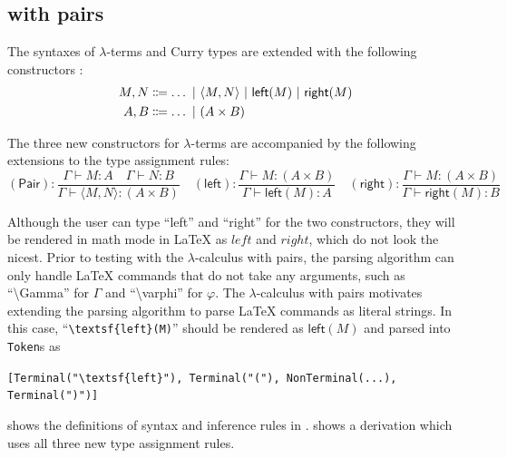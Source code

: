 \subsection{\lc{} with pairs}
\label{evaluation:lambda-pairs}
\begin{definition}
    The syntaxes of $\lambda$-terms and Curry types are extended with the following constructors \cite{van-bakel:2022}:
    \begin{align*}
        M, N &\Coloneqq \ldots \ |\  \langle M, N \rangle \ |\  \textsf{left}(M) \ |\  \textsf{right}(M) \\
        A, B &\Coloneqq \ldots \ |\  (A \times B)
    \end{align*}
\end{definition}
\begin{definition}
    The three new constructors for $\lambda$-terms are accompanied by the following extensions to the type assignment rules:
    \[
        (\textsf{Pair}): \frac{\Gamma \vdash M: A \quad \Gamma \vdash N: B}{\Gamma \vdash \langle M, N \rangle: (A \times B)} \quad (\textsf{left}): \frac{\Gamma \vdash M: (A \times B)}{\Gamma \vdash \textsf{left}(M): A} \quad (\textsf{right}): \frac{\Gamma \vdash M: (A \times B)}{\Gamma \vdash \textsf{right}(M): B}
    \]
\end{definition}
Although the user can type ``left'' and ``right'' for the two constructors, they will be rendered in math mode in \LaTeX{} as $left$ and $right$, which do not look the nicest. Prior to testing with the $\lambda$-calculus with pairs, the parsing algorithm can only handle \LaTeX{} commands that do not take any arguments, such as ``\textbackslash Gamma'' for $\Gamma$ and ``\textbackslash varphi'' for $\varphi$. The $\lambda$-calculus with pairs motivates extending the parsing algorithm to parse \LaTeX{} commands as literal strings. In this case, ``\lstinline|\textsf{left}(M)|'' should be rendered as $\textsf{left}(M)$ and parsed into \lstinline{Token}s as
\begin{center}
    \lstinline|[Terminal("\textsf{left}"), Terminal("("), NonTerminal(...), Terminal(")")]|
\end{center}
 shows the definitions of syntax and inference rules in \projectname{}.  shows a derivation which uses all three new type assignment rules.
